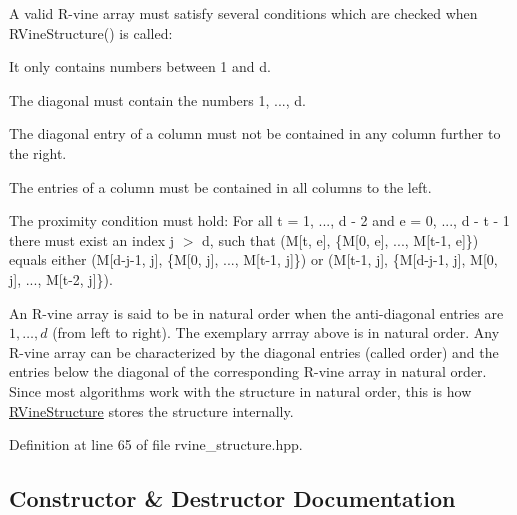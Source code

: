 A valid R-\/vine array must satisfy several conditions which are checked when {\ttfamily R\+Vine\+Structure()} is called\+:
\begin{DoxyEnumerate}
\item It only contains numbers between 1 and d.
\item The diagonal must contain the numbers 1, ..., d.
\item The diagonal entry of a column must not be contained in any column further to the right.
\item The entries of a column must be contained in all columns to the left.
\item The proximity condition must hold\+: For all t = 1, ..., d -\/ 2 and e = 0, ..., d -\/ t -\/ 1 there must exist an index j $>$ d, such that {\ttfamily (M\mbox{[}t, e\mbox{]}, \{M\mbox{[}0, e\mbox{]}, ..., M\mbox{[}t-\/1, e\mbox{]}\})} equals either {\ttfamily (M\mbox{[}d-\/j-\/1, j\mbox{]}, \{M\mbox{[}0, j\mbox{]}, ..., M\mbox{[}t-\/1, j\mbox{]}\})} or {\ttfamily (M\mbox{[}t-\/1, j\mbox{]}, \{M\mbox{[}d-\/j-\/1, j\mbox{]}, M\mbox{[}0, j\mbox{]}, ..., M\mbox{[}t-\/2, j\mbox{]}\})}.
\end{DoxyEnumerate}

An R-\/vine array is said to be in natural order when the anti-\/diagonal entries are $ 1, \dots, d $ (from left to right). The exemplary arrray above is in natural order. Any R-\/vine array can be characterized by the diagonal entries (called order) and the entries below the diagonal of the corresponding R-\/vine array in natural order. Since most algorithms work with the structure in natural order, this is how \hyperlink{classvinecopulib_1_1_r_vine_structure}{R\+Vine\+Structure} stores the structure internally. 

Definition at line 65 of file rvine\+\_\+structure.\+hpp.



\subsection{Constructor \& Destructor Documentation}
\mbox{\label{classvinecopulib_1_1_r_vine_structure_a271688bc56e2950d5a27213f4b5f9fda}} 
